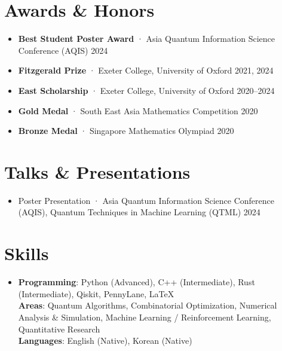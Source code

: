 \documentclass[letterpaper,11pt]{article}
\newcommand{\resumeItem}[1]{
  \item{
    {#1 \vspace{-4pt}}
  }
}
\newcommand{\resumeSubHeadingListStart}{\begin{itemize}[leftmargin=0.15in, label={}]}
\newcommand{\resumeSubHeadingListEnd}{\end{itemize}}
\begin{document}
\section{Awards \& Honors}
\resumeSubHeadingListStart
  \resumeItem{\textbf{Best Student Poster Award} · Asia Quantum Information Science Conference (AQIS) \hfill 2024}
  \resumeItem{\textbf{Fitzgerald Prize} · Exeter College, University of Oxford \hfill 2021, 2024}
  \resumeItem{\textbf{East Scholarship} · Exeter College, University of Oxford \hfill 2020--2024}
  \resumeItem{\textbf{Gold Medal} · South East Asia Mathematics Competition \hfill 2020}
  \resumeItem{\textbf{Bronze Medal} · Singapore Mathematics Olympiad \hfill 2020}
\resumeSubHeadingListEnd

\section{Talks \& Presentations}
\resumeSubHeadingListStart
  \resumeItem{Poster Presentation · Asia Quantum Information Science Conference (AQIS), Quantum Techniques in Machine Learning (QTML) \hfill 2024}
\resumeSubHeadingListEnd

\section{Skills}
\begin{itemize}[leftmargin=0.15in, label={}]
    \item{
     \textbf{Programming}: Python (Advanced), C++ (Intermediate), Rust (Intermediate), Qiskit, PennyLane, \LaTeX \\
     \textbf{Areas}: Quantum Algorithms, Combinatorial Optimization, Numerical Analysis \& Simulation, Machine Learning / Reinforcement Learning, Quantitative Research \\
     \textbf{Languages}: English (Native), Korean (Native)
    }
 \end{itemize}
\end{document}
